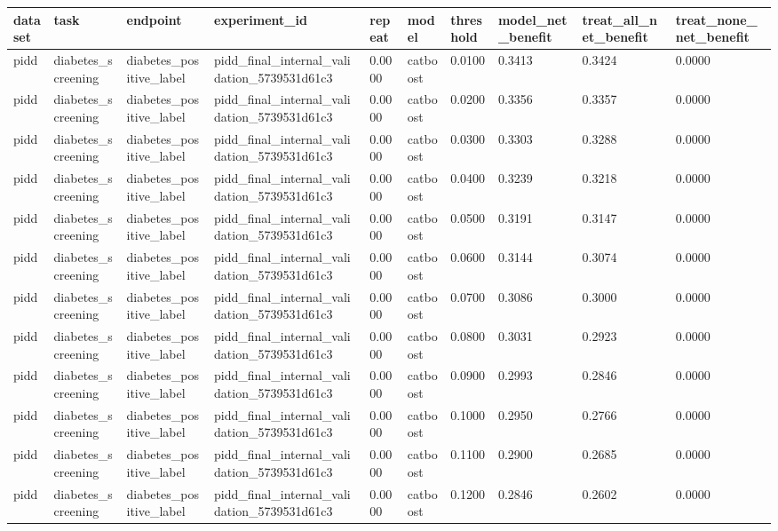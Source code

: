 \begin{tabular}{llllllllll}
\hline
dataset & task & endpoint & experiment\_id & repeat & model & threshold & model\_net\_benefit & treat\_all\_net\_benefit & treat\_none\_net\_benefit \\
\hline
pidd & diabetes\_screening & diabetes\_positive\_label & pidd\_final\_internal\_validation\_5739531d61c3 & 0.0000 & catboost & 0.0100 & 0.3413 & 0.3424 & 0.0000 \\
pidd & diabetes\_screening & diabetes\_positive\_label & pidd\_final\_internal\_validation\_5739531d61c3 & 0.0000 & catboost & 0.0200 & 0.3356 & 0.3357 & 0.0000 \\
pidd & diabetes\_screening & diabetes\_positive\_label & pidd\_final\_internal\_validation\_5739531d61c3 & 0.0000 & catboost & 0.0300 & 0.3303 & 0.3288 & 0.0000 \\
pidd & diabetes\_screening & diabetes\_positive\_label & pidd\_final\_internal\_validation\_5739531d61c3 & 0.0000 & catboost & 0.0400 & 0.3239 & 0.3218 & 0.0000 \\
pidd & diabetes\_screening & diabetes\_positive\_label & pidd\_final\_internal\_validation\_5739531d61c3 & 0.0000 & catboost & 0.0500 & 0.3191 & 0.3147 & 0.0000 \\
pidd & diabetes\_screening & diabetes\_positive\_label & pidd\_final\_internal\_validation\_5739531d61c3 & 0.0000 & catboost & 0.0600 & 0.3144 & 0.3074 & 0.0000 \\
pidd & diabetes\_screening & diabetes\_positive\_label & pidd\_final\_internal\_validation\_5739531d61c3 & 0.0000 & catboost & 0.0700 & 0.3086 & 0.3000 & 0.0000 \\
pidd & diabetes\_screening & diabetes\_positive\_label & pidd\_final\_internal\_validation\_5739531d61c3 & 0.0000 & catboost & 0.0800 & 0.3031 & 0.2923 & 0.0000 \\
pidd & diabetes\_screening & diabetes\_positive\_label & pidd\_final\_internal\_validation\_5739531d61c3 & 0.0000 & catboost & 0.0900 & 0.2993 & 0.2846 & 0.0000 \\
pidd & diabetes\_screening & diabetes\_positive\_label & pidd\_final\_internal\_validation\_5739531d61c3 & 0.0000 & catboost & 0.1000 & 0.2950 & 0.2766 & 0.0000 \\
pidd & diabetes\_screening & diabetes\_positive\_label & pidd\_final\_internal\_validation\_5739531d61c3 & 0.0000 & catboost & 0.1100 & 0.2900 & 0.2685 & 0.0000 \\
pidd & diabetes\_screening & diabetes\_positive\_label & pidd\_final\_internal\_validation\_5739531d61c3 & 0.0000 & catboost & 0.1200 & 0.2846 & 0.2602 & 0.0000 \\

\end{tabular}
